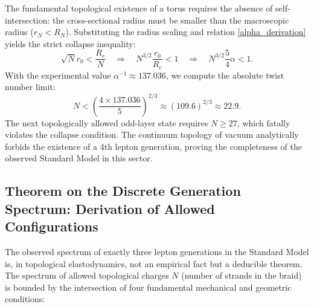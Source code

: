 \documentclass[11pt,a4paper]{article}
\begin{document}
The fundamental topological existence of a torus requires the absence of self-intersection: the cross-sectional radius must be smaller than the macroscopic radius ($r_N < R_N$). Substituting the radius scaling and relation \eqref{alpha_derivation} yields the strict collapse inequality:
\begin{equation}
\sqrt{N} r_0 < \frac{R_e}{N} \quad \Longrightarrow \quad N^{3/2} \frac{r_0}{R_e} < 1 \quad \Longrightarrow \quad N^{3/2} \frac{5}{4}\alpha < 1.
\end{equation}
With the experimental value $\alpha^{-1} \approx 137.036$, we compute the absolute twist number limit:
\begin{equation}
N < \left( \frac{4 \times 137.036}{5} \right)^{2/3} \approx (109.6)^{2/3} \approx 22.9.
\end{equation}
The next topologically allowed odd-layer state requires $N \ge 27$, which fatally violates the collapse condition. The continuum topology of vacuum analytically forbids the existence of a 4th lepton generation, proving the completeness of the observed Standard Model in this sector.

\subsection{Theorem on the Discrete Generation Spectrum: Derivation of Allowed Configurations}
The observed spectrum of exactly three lepton generations in the Standard Model is, in topological elastodynamics, not an empirical fact but a deducible theorem. The spectrum of allowed topological charges $N$ (number of strands in the braid) is bounded by the intersection of four fundamental mechanical and geometric conditions:
\end{document}
